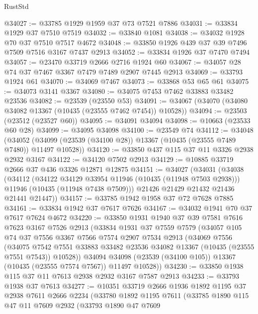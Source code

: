 \begin{lexlean}{RustStd}
\begin{coremodule}
@34027 := @33785 @1929 @1959 @37 @73 @7521 @7886
@34031 := @33834 @1929 @37 @7510 @7519
@34032 := @33840 @1081
@34038 := @34032 @1928 @70 @37 @7510 @7517 @4672
@34048 := @33850 @1926 @439 @37 @39 @7496 @7509 @7516 @3167 @7437 @2913
@34052 := @33834 @1926 @37 @7470 @7494
@34057 := @23470 @33719 @2666 @2716 @1924 @60
@34067 := @34057 @28 @74 @37 @7467 @3367 @7479 @7489 @2907 @7445 @2913
@34069 := @33793 @1924 @61
@34070 := @34069 @7467
@34073 := @33868 @53 @65 @61
@34075 := @34073 @3141 @3367
@34080 := @34075 @7453 @7462 @33883 @33482 @23536
@34082 := @23539 (@23550 @53)
@34091 := @34067 (@34070 (@34080 @34082 @13367 (@10435 (@23555 @7462 @7454)) @10528))
@34094 := @23503 (@23512 (@23527 @60))
@34095 := @34091 @34094
@34098 := @10663 (@23533 @60 @28)
@34099 := @34095 @34098
@34100 := @23549 @74
@34112 := @34048
    (@34052 (@34099 (@23539 (@34100 @28)) @13367 (@10435 (@23555 @7489 @7480)) @11497 @10528))
@34120 := @33850 @437 @115 @37 @11 @3326 @2938 @2932 @3167
@34122 := @34120 @7502 @2913
@34129 := @10885 @33719 @2666 @37 @436 @3326 @12871 @12875
@34151 := @34027
    (@34031
      (@34038
        (@34112
          (@34122 @34129 @33954 @11946 (@10435 (@11948 @7503 @2938)))
          @11946
          (@10435 (@11948 @7438 @7509)))
        @21426
        @21429
        @21432
        @21436
        @21441
        @21447))
@34157 := @33785 @1942 @1958 @37 @72 @7628 @7885
@34161 := @33834 @1942 @37 @7617 @7626
@34167 := @34032 @1941 @70 @37 @7617 @7624 @4672
@34220 := @33850
    @1931
    @1940
    @37
    @39
    @7581
    @7616
    @7623
    @3167
    @7526
    @2913
    (@33834
      @1931
      @37
      @7559
      @7579
      (@34057
        @105
        @74
        @37
        @7556
        @3367
        @7566
        @7574
        @2907
        @7534
        @2913
        (@34069
          @7556
          (@34075
            @7542
            @7551
            @33883
            @33482
            @23536
            @34082
            @13367
            (@10435 (@23555 @7551 @7543))
            @10528))
        @34094
        @34098
        (@23539 (@34100 @105))
        @13367
        (@10435 (@23555 @7574 @7567))
        @11497
        @10528))
@34230 := @33850 @1938 @115 @37 @11 @7613 @2938 @2932 @3167 @7587 @2913
@34233 := @33793 @1938 @37 @7613
@34277 := @10351
    @33719
    @2666
    @1936
    @1892
    @1195
    @37
    @2938
    @7611
    @2666
    @2234
    (@33780
      @1892
      @1195
      @7611
      (@33785
        @1890
        @115
        @47
        @11
        @7609
        @2932
        (@33793
          @1890
          @47
          @7609

\end{coremodule}
\end{lexlean}
